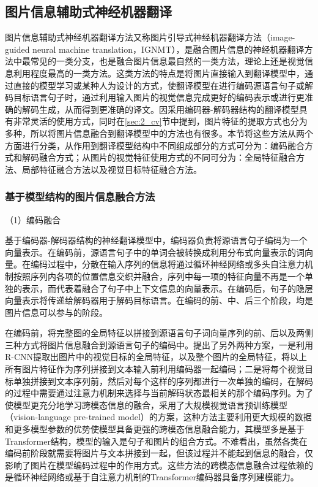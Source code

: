 \subsection{图片信息辅助式神经机器翻译}
\label{sec:2_ignmt}

图片信息辅助式神经机器翻译方法又称图片引导式神经机器翻译方法（image-guided neural machine translation，IGNMT），是融合图片信息的神经机器翻译方法中最常见的一类分支，也是融合图片信息最自然的一类方法，理论上还是视觉信息利用程度最高的一类方法。这类方法的特点是将图片直接输入到翻译模型中，通过直接的模型学习或某种人为设计的方式，使翻译模型在进行编码源语言句子或解码目标语言句子时，通过利用输入图片的视觉信息完成更好的编码表示或进行更准确的解码生成，从而得到更准确的译文。因采用编码器-解码器结构的翻译模型具有非常灵活的使用方式，同时在\ref{sec:2_cv}节中提到，图片特征的提取方式也分为多种，所以将图片信息融合到翻译模型中的方法也有很多。本节将这些方法从两个方面进行分类，从作用到翻译模型结构中不同组成部分的方式可分为：编码融合方式和解码融合方式；从图片的视觉特征使用方式的不同可分为：全局特征融合方法、局部特征融合方法以及视觉目标特征融合方法。

\subsubsection{基于模型结构的图片信息融合方法}

{\sffamily （1）编码融合}

基于编码器-解码器结构的神经翻译模型中，编码器负责将源语言句子编码为一个向量表示。在编码前，源语言句子中的单词会被转换成利用分布式向量表示的词向量。在编码过程中，分散在输入序列的信息将通过循环神经网络或多头自注意力机制按照序列内各项的位置信息交织并融合，序列中每一项的特征向量不再是一个单独的表示，而代表着融合了句子中上下文信息的向量表示。在编码后，句子的隐层向量表示将传递给解码器用于解码目标语言。在编码的前、中、后三个阶段，均是图片信息可以参与的阶段。

在编码前，将完整图的全局特征以拼接到源语言句子词向量序列的前、后以及两侧三种方式将图片信息融合到源语言句子的编码中。提出了另外两种方案，一是利用R-CNN提取出图片中的视觉目标的全局特征，以及整个图片的全局特征，将以上所有图片特征作为序列拼接到文本输入前利用编码器一起编码；二是将每个视觉目标单独拼接到文本序列前，然后对每个这样的序列都进行一次单独的编码，在解码的过程中需要通过注意力机制来选择与当前解码状态最相关的那个编码序列。为了使模型更充分地学习跨模态信息的融合，采用了大规模视觉语言预训练模型（vision-language pre-trained model）的方案，这种方法主要利用更大规模的数据和更多模型参数的优势使模型具备更强的跨模态信息融合能力，其模型多是基于Transformer结构，模型的输入是句子和图片的组合方式。不难看出，虽然各类在编码前阶段就需要将图片与文本拼接到一起，但该过程并不能起到信息的融合，仅影响了图片在模型编码过程中的作用方式。这些方法的跨模态信息融合过程依赖的是循环神经网络或基于自注意力机制的Transformer编码器具备序列建模能力。


